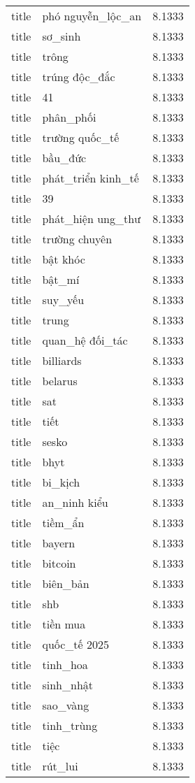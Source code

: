 \documentclass{article}
\begin{document}
\begin{tabular}{lll}
title & phó nguyễn\_lộc\_an & 8.1333\\
title & sơ\_sinh & 8.1333\\
title & trông & 8.1333\\
title & trúng độc\_đắc & 8.1333\\
title & 41 & 8.1333\\
title & phân\_phối & 8.1333\\
title & trường quốc\_tế & 8.1333\\
title & bầu\_đức & 8.1333\\
title & phát\_triển kinh\_tế & 8.1333\\
title & 39 & 8.1333\\
title & phát\_hiện ung\_thư & 8.1333\\
title & trường chuyên & 8.1333\\
title & bật khóc & 8.1333\\
title & bật\_mí & 8.1333\\
title & suy\_yếu & 8.1333\\
title & trung & 8.1333\\
title & quan\_hệ đối\_tác & 8.1333\\
title & billiards & 8.1333\\
title & belarus & 8.1333\\
title & sat & 8.1333\\
title & tiết & 8.1333\\
title & sesko & 8.1333\\
title & bhyt & 8.1333\\
title & bi\_kịch & 8.1333\\
title & an\_ninh kiểu & 8.1333\\
title & tiềm\_ẩn & 8.1333\\
title & bayern & 8.1333\\
title & bitcoin & 8.1333\\
title & biên\_bản & 8.1333\\
title & shb & 8.1333\\
title & tiền mua & 8.1333\\
title & quốc\_tế 2025 & 8.1333\\
title & tinh\_hoa & 8.1333\\
title & sinh\_nhật & 8.1333\\
title & sao\_vàng & 8.1333\\
title & tinh\_trùng & 8.1333\\
title & tiệc & 8.1333\\
title & rút\_lui & 8.1333\\

\end{tabular}
\end{document}
